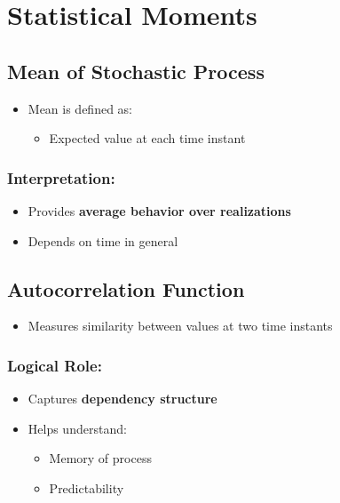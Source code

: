 \documentclass[12pt]{article}
\begin{document}
\section{Statistical Moments}

\subsection{Mean of Stochastic Process}

\begin{itemize}
    \item Mean is defined as:
    \begin{itemize}
        \item Expected value at each time instant
    \end{itemize}
\end{itemize}

\subsubsection*{Interpretation:}

\begin{itemize}
    \item Provides \textbf{average behavior over realizations}
    \item Depends on time in general
\end{itemize}

\subsection{Autocorrelation Function}

\begin{itemize}
    \item Measures similarity between values at two time instants
\end{itemize}

\subsubsection*{Logical Role:}

\begin{itemize}
    \item Captures \textbf{dependency structure}
    \item Helps understand:
    \begin{itemize}
        \item Memory of process
        \item Predictability
    \end{itemize}
\end{itemize}
\end{document}
